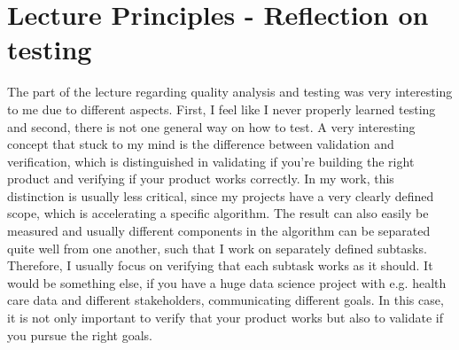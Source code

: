 \documentclass[11pt]{article}
\begin{document}
\section{Lecture Principles - Reflection on testing} \label{ch:lecture}
The part of the lecture regarding quality analysis and testing was very interesting to me due to different aspects. First, I feel like I never properly learned testing and second, there is not one general way on how to test. A very interesting concept that stuck to my mind is the difference between validation and verification, which is distinguished in validating if you're building the right product and verifying if your product works correctly. In my work, this distinction is usually less critical, since my projects have a very clearly defined scope, which is accelerating a specific algorithm. The result can also easily be measured and usually different components in the algorithm can be separated quite well from one another, such that I work on separately defined subtasks. Therefore, I usually focus on verifying that each subtask works as it should. It would be something else, if you have a huge data science project with e.g. health care data and different stakeholders, communicating different goals. In this case, it is not only important to verify that your product works but also to validate if you pursue the right goals.
\end{document}
